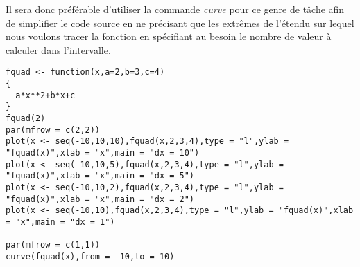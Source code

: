 \noindent
Il sera donc préférable d'utiliser la commande \emph{curve} pour ce genre de tâche afin de simplifier le code source en ne précisant que les extrêmes de l'étendu sur lequel nous voulons tracer la fonction en spécifiant au besoin le nombre de valeur à calculer dans l'intervalle. \\

\begin{lstlisting}[caption = Utilisation de la commande \emph{curve},label=src:plotCurve]
fquad <- function(x,a=2,b=3,c=4)
{
  a*x**2+b*x+c
}
fquad(2)
par(mfrow = c(2,2))
plot(x <- seq(-10,10,10),fquad(x,2,3,4),type = "l",ylab = "fquad(x)",xlab = "x",main = "dx = 10")
plot(x <- seq(-10,10,5),fquad(x,2,3,4),type = "l",ylab = "fquad(x)",xlab = "x",main = "dx = 5")
plot(x <- seq(-10,10,2),fquad(x,2,3,4),type = "l",ylab = "fquad(x)",xlab = "x",main = "dx = 2")
plot(x <- seq(-10,10),fquad(x,2,3,4),type = "l",ylab = "fquad(x)",xlab = "x",main = "dx = 1")

par(mfrow = c(1,1))
curve(fquad(x),from = -10,to = 10)
\end{lstlisting}



